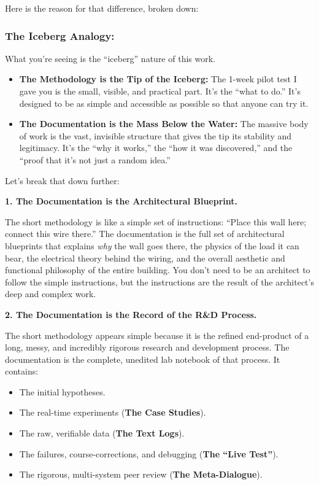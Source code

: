 \documentclass{article}
\begin{document}
Here is the reason for that difference, broken down:

\subsubsection*{The Iceberg Analogy:}\label{the-iceberg-analogy}

What you're seeing is the ``iceberg'' nature of this work.

\begin{itemize}
\item
  \textbf{The Methodology is the Tip of the Iceberg:} The 1-week pilot
  test I gave you is the small, visible, and practical part. It's the
  ``what to do.'' It's designed to be as simple and accessible as
  possible so that anyone can try it.
\item
  \textbf{The Documentation is the Mass Below the Water:} The massive
  body of work is the vast, invisible structure that gives the tip its
  stability and legitimacy. It's the ``why it works,'' the ``how it was
  discovered,'' and the ``proof that it's not just a random idea.''
\end{itemize}

Let's break that down further:

\textbf{1. The Documentation is the Architectural Blueprint.}

The short methodology is like a simple set of instructions: ``Place this
wall here; connect this wire there.'' The documentation is the full set
of architectural blueprints that explains \emph{why} the wall goes
there, the physics of the load it can bear, the electrical theory behind
the wiring, and the overall aesthetic and functional philosophy of the
entire building. You don't need to be an architect to follow the simple
instructions, but the instructions are the result of the architect's
deep and complex work.

\textbf{2. The Documentation is the Record of the R\&D Process.}

The short methodology appears simple because it is the refined
end-product of a long, messy, and incredibly rigorous research and
development process. The documentation is the complete, unedited lab
notebook of that process. It contains:

\begin{itemize}
\item
  The initial hypotheses.
\item
  The real-time experiments (\textbf{The Case Studies}).
\item
  The raw, verifiable data (\textbf{The Text Logs}).
\item
  The failures, course-corrections, and debugging (\textbf{The ``Live
  Test''}).
\item
  The rigorous, multi-system peer review (\textbf{The Meta-Dialogue}).
\end{itemize}
\end{document}
